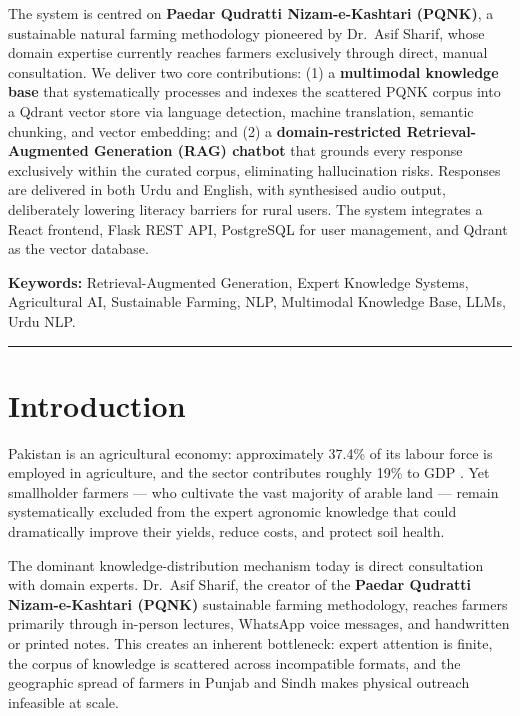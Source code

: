 \documentclass[12pt, a4paper]{article}
\begin{document}
\begin{onehalfspacing}
The system is centred on \textbf{Paedar Qudratti Nizam-e-Kashtari (PQNK)}, a
sustainable natural farming methodology pioneered by Dr.~Asif Sharif, whose domain
expertise currently reaches farmers exclusively through direct, manual consultation.
We deliver two core contributions: (1) a \textbf{multimodal knowledge base} that
systematically processes and indexes the scattered PQNK corpus into a Qdrant vector
store via language detection, machine translation, semantic chunking, and vector
embedding; and (2) a \textbf{domain-restricted Retrieval-Augmented Generation (RAG)
chatbot} that grounds every response exclusively within the curated corpus,
eliminating hallucination risks. Responses are delivered in both Urdu and English,
with synthesised audio output, deliberately lowering literacy barriers for rural
users. The system integrates a React frontend, Flask REST API, PostgreSQL for user
management, and Qdrant as the vector database.

\vspace{6pt}
\noindent\textbf{Keywords:} Retrieval-Augmented Generation, Expert Knowledge Systems,
Agricultural AI, Sustainable Farming, NLP, Multimodal Knowledge Base, LLMs, Urdu NLP.

\vspace{14pt}
\hrule\vspace{14pt}

\section{Introduction}

Pakistan is an agricultural economy: approximately 37.4\% of its labour force is
employed in agriculture, and the sector contributes roughly 19\% to GDP
\citep{pbs2023}. Yet smallholder farmers --- who cultivate the vast majority of
arable land --- remain systematically excluded from the expert agronomic knowledge
that could dramatically improve their yields, reduce costs, and protect soil health.

The dominant knowledge-distribution mechanism today is direct consultation with
domain experts. Dr.~Asif Sharif, the creator of the
\textbf{Paedar Qudratti Nizam-e-Kashtari (PQNK)} sustainable farming methodology,
reaches farmers primarily through in-person lectures, WhatsApp voice messages, and
handwritten or printed notes. This creates an inherent bottleneck: expert attention
is finite, the corpus of knowledge is scattered across incompatible formats, and the
geographic spread of farmers in Punjab and Sindh makes physical outreach infeasible
at scale.


\end{onehalfspacing}
\end{document}
